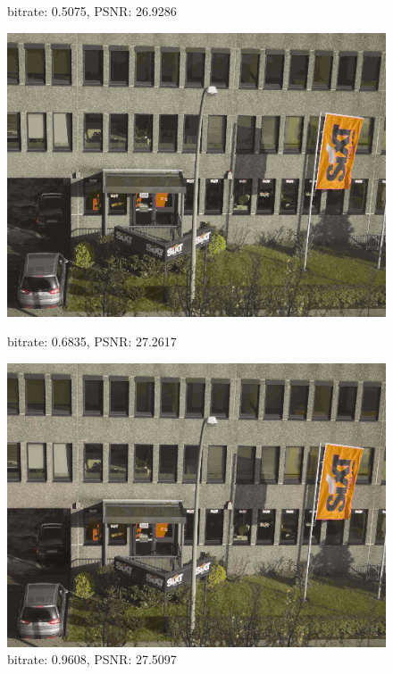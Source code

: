 \documentclass[12pt]{article}
\begin{document}
\begin{enumerate}
\begin{figure}[ht]
\begin{minipage}[c]{0.48\linewidth}
				\caption*{bitrate: 0.5075, PSNR: 26.9286}
			\end{minipage}
			\begin{minipage}[c]{0.48\linewidth}
				\centering
				\includegraphics[scale=.23]{./res/sample_image/decompressed2.png}
				\caption*{bitrate: 0.6835, PSNR: 27.2617}
				\vspace{10pt}
				\includegraphics[scale=.23]{./res/sample_image/decompressed3.png}
				\caption*{bitrate: 0.9608, PSNR: 27.5097}
			\end{minipage}
		\end{figure}
		

\end{enumerate}
\end{document}

